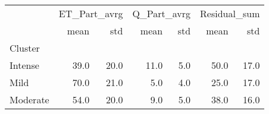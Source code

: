 \begin{tabular}{lrrrrrr}
\toprule
{} & \multicolumn{2}{l}{ET\_Part\_avrg} & \multicolumn{2}{l}{Q\_Part\_avrg} & \multicolumn{2}{l}{Residual\_sum} \\
{} &         mean &   std &        mean &  std &         mean &   std \\
Cluster  &              &       &             &      &              &       \\
\midrule
Intense  &         39.0 &  20.0 &        11.0 &  5.0 &         50.0 &  17.0 \\
Mild     &         70.0 &  21.0 &         5.0 &  4.0 &         25.0 &  17.0 \\
Moderate &         54.0 &  20.0 &         9.0 &  5.0 &         38.0 &  16.0 \\
\bottomrule
\end{tabular}
